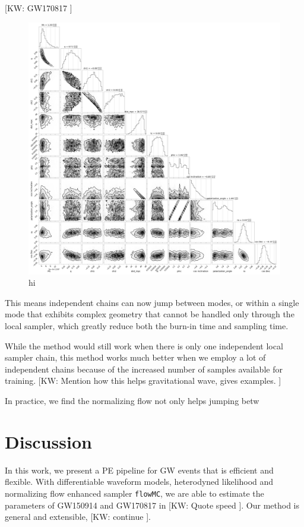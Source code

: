 \documentclass[twocolumn]{aastex631}
\newcommand{\kw}[1]{{\color{rb4}[KW: #1 ]}}
\begin{document}
\kw{GW170817}

\begin{figure}
\includegraphics[width=0.99\linewidth]{static/GW170817.png}
\caption{
    hi
}
\label{fig:GW170817}
\end{figure}

This means independent chains can now jump between modes, or within a single
mode that exhibits complex geometry that cannot be handled only through the
local sampler, which greatly reduce both the burn-in time and sampling time.

While the method would still work when there is only one independent local
sampler chain, this method works much better when we employ a lot of independent
chains because of the increased number of samples available for training. 
\kw{Mention how this helps gravitational wave, gives examples.}

In practice, we find the normalizing flow not only helps jumping betw


\section{Discussion}
\label{sec: Discussion}

In this work, we present a PE pipeline for GW events that is efficient and
flexible. With differentiable waveform models, heterodyned likelihood and
normalizing flow enhanced sampler \texttt{flowMC}, we are able to estimate the
parameters of GW150914 and GW170817 in \kw{Quote speed}. Our method is general
and extensible, \kw{continue}.
\end{document}
